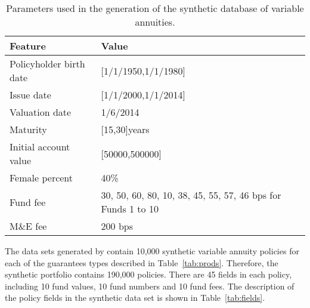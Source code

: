 \begin{table}
\begin{small}
\begin{center}
\begin{tabular}{l l l}
\toprule
Feature & Value \\
\midrule
Policyholder birth date & [1/1/1950,1/1/1980] \\
Issue date & [1/1/2000,1/1/2014] \\
Valuation date & 1/6/2014 \\
Maturity & [15,30]years \\
Initial account value & [50000,500000] \\
Female percent & 40\% \\
Fund fee & 30, 50, 60, 80, 10, 38, 45, 55, 57, 46 bps for Funds 1 to 10 \\
M\&E fee & 200 bps \\
\bottomrule
\end{tabular}
\caption{Parameters used in the generation of the synthetic database of variable annuities.}\label{tab:params}
\end{center}
\end{small}
\end{table}


 The data sets generated by \cite{gan2017modeling} contain 10,000 synthetic variable annuity policies for each of the guarantees types described in Table~\ref{tab:prods}. Therefore, the synthetic portfolio contains 190,000 policies. There are 45 fields in each policy, including 10 fund values, 10 fund numbers and 10 fund fees. The description of the policy fields in the synthetic data set is shown in Table~\ref{tab:fields}.

